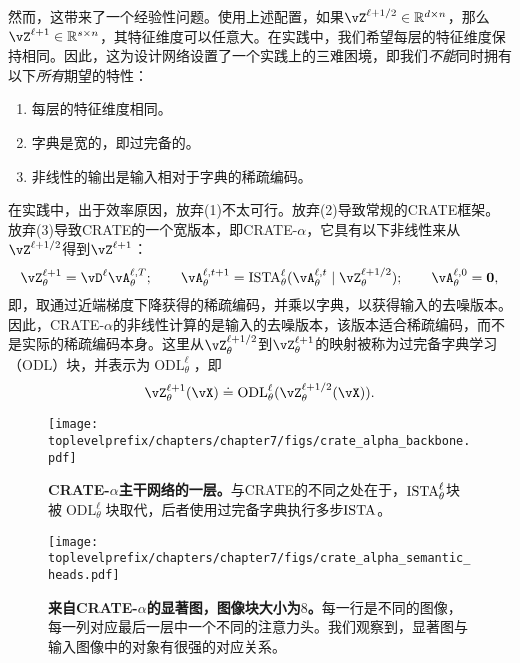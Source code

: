 \documentclass[../../book-main.tex]{subfiles}
\begin{document}
然而，这带来了一个经验性问题。使用上述配置，如果\(\vZ^{\ell + 1/2} \in \R^{d \times n}\)，那么\(\vZ^{\ell + 1} \in \R^{s \times n}\)，其特征维度可以任意大。在实践中，我们希望每层的特征维度保持相同。因此，这为设计网络设置了一个实践上的三难困境，即我们\textit{不能}同时拥有以下\textit{所有}期望的特性：
\begin{enumerate}
    \item 每层的特征维度相同。
    \item 字典是宽的，即过完备的。
    \item 非线性的输出是输入相对于字典的稀疏编码。
\end{enumerate}
在实践中，出于效率原因，放弃(1)不太可行。放弃(2)导致常规的CRATE框架。放弃(3)导致CRATE的一个宽版本，即CRATE-\(\alpha\)，它具有以下非线性来从\(\vZ^{\ell + 1/2}\)得到\(\vZ^{\ell + 1}\)：
\begin{equation}
    \vZ_{\theta}^{\ell + 1} = \vD^{\ell}\vA_{\theta}^{\ell, T}; \qquad \vA_{\theta}^{\ell, t + 1} = \ISTA_{\theta}^{\ell}(\vA_{\theta}^{\ell, t} \mid \vZ_{\theta}^{\ell + 1/2}); \qquad \vA_{\theta}^{\ell, 0} = \vzero,
\end{equation}
即，取通过近端梯度下降获得的稀疏编码，并乘以字典，以获得输入的去噪版本。因此，CRATE-\(\alpha\)的非线性计算的是输入的去噪版本，该版本适合稀疏编码，而不是实际的稀疏编码本身。这里从\(\vZ_{\theta}^{\ell + 1/2}\)到\(\vZ_{\theta}^{\ell + 1}\)的映射被称为过完备字典学习（ODL）块，并表示为\(\operatorname{ODL}_{\theta}^{\ell}\)，即
\begin{equation}
    \vZ_{\theta}^{\ell + 1}(\vX) \doteq \operatorname{ODL}_{\theta}^{\ell}(\vZ_{\theta}^{\ell + 1/2}(\vX)).
\end{equation}

\begin{figure}
    \centering 
    \texttt{[image: \\toplevelprefix/chapters/chapter7/figs/crate\_alpha\_backbone.pdf]}
    \caption{\small\textbf{CRATE-\(\alpha\)主干网络的一层。}与CRATE的不同之处在于，\(\operatorname{ISTA}_{\theta}^{\ell}\)块被\(\operatorname{ODL}_{\theta}^{\ell}\)块取代，后者使用过完备字典执行多步\(\operatorname{ISTA}\)。}
    \label{fig:crate_alpha_backbone}
\end{figure}

\begin{figure}
    \centering 
    \texttt{[image: \\toplevelprefix/chapters/chapter7/figs/crate\_alpha\_semantic\_heads.pdf]}
    \caption{\small\textbf{来自CRATE-\(\alpha\)的显著图，图像块大小为\(8\)。}每一行是不同的图像，每一列对应最后一层中一个不同的注意力头。我们观察到，显著图与输入图像中的对象有很强的对应关系。}
    \label{fig:crate_alpha_saliency_maps}
\end{figure}
\end{document}
